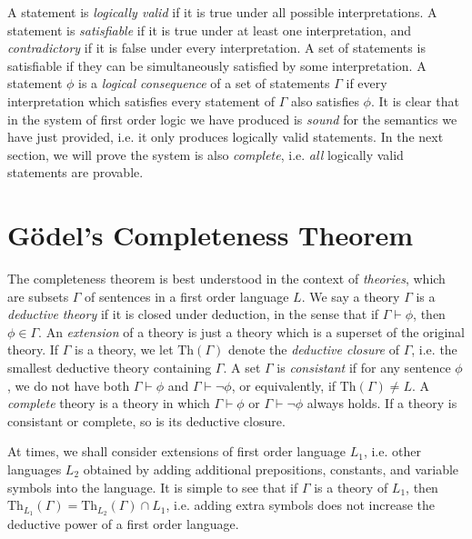 A statement is \emph{logically valid} if it is true under all possible interpretations. A statement is \emph{satisfiable} if it is true under at least one interpretation, and \emph{contradictory} if it is false under every interpretation. A set of statements is satisfiable if they can be simultaneously satisfied by some interpretation. A statement $\phi$ is a \emph{logical consequence} of a set of statements $\Gamma$ if every interpretation which satisfies every statement of $\Gamma$ also satisfies $\phi$. It is clear that in the system of first order logic we have produced is \emph{sound} for the semantics we have just provided, i.e. it only produces logically valid statements. In the next section, we will prove the system is also \emph{complete}, i.e. \emph{all} logically valid statements are provable.





\section{G\"{o}del's Completeness Theorem}

The completeness theorem is best understood in the context of \emph{theories}, which are subsets $\Gamma$ of sentences in a first order language $L$. We say a theory $\Gamma$ is a \emph{deductive theory} if it is closed under deduction, in the sense that if $\Gamma \vdash \phi$, then $\phi \in \Gamma$. An \emph{extension} of a theory is just a theory which is a superset of the original theory. If $\Gamma$ is a theory, we let $\text{Th}(\Gamma)$ denote the \emph{deductive closure} of $\Gamma$, i.e. the smallest deductive theory containing $\Gamma$. A set $\Gamma$ is \emph{consistant} if for any sentence $\phi$, we do not have both $\Gamma \vdash \phi$ and $\Gamma \vdash \neg \phi$, or equivalently, if $\text{Th}(\Gamma) \neq L$. A \emph{complete} theory is a theory in which $\Gamma \vdash \phi$ or $\Gamma \vdash \neg \phi$ always holds. If a theory is consistant or complete, so is its deductive closure.

At times, we shall consider extensions of first order language $L_1$, i.e. other languages $L_2$ obtained by adding additional prepositions, constants, and variable symbols into the language. It is simple to see that if $\Gamma$ is a theory of $L_1$, then $\text{Th}_{L_1}(\Gamma) = \text{Th}_{L_2}(\Gamma) \cap L_1$, i.e. adding extra symbols does not increase the deductive power of a first order language.

